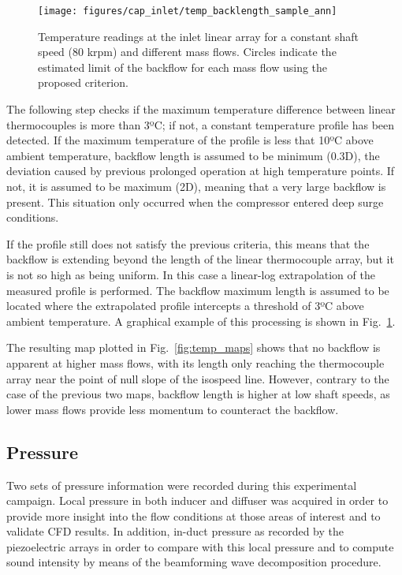 \begin{figure}[tb!]
\centering
\texttt{[image: figures/cap\_inlet/temp\_backlength\_sample\_ann]}
\caption[Backflow length temperature criterion]{Temperature readings at the inlet linear array for a constant shaft speed (80 krpm) and different mass flows. Circles indicate the estimated limit of the backflow for each mass flow using the proposed criterion.}
\label{fig:temp_backlength_sample}
\end{figure}

The following step checks if the maximum temperature difference between linear thermocouples is more than 3ºC; if not,  a constant temperature profile has been detected. If the maximum temperature of the profile is less that 10ºC above ambient temperature, backflow length is assumed to be minimum (0.3D), the deviation caused by previous prolonged operation at high temperature points. If not, it is assumed to be maximum (2D), meaning that a very large backflow is present. This situation only occurred when the compressor entered deep surge conditions.

If the profile still does not satisfy the previous criteria, this means that the backflow is extending beyond the length of the linear thermocouple array, but it is not so high as being uniform. In this case a linear-log extrapolation of the measured profile is performed. The backflow maximum length is assumed to be located where the extrapolated profile intercepts a threshold of 3ºC above ambient temperature. A graphical example of this processing is shown in Fig.~\ref{fig:temp_backlength_sample}.

The resulting map plotted in Fig.~\ref{fig:temp_maps} shows that no backflow is apparent at higher mass flows, with its length only reaching the thermocouple array near the point of null slope of the isospeed line. However, contrary to the case of the previous two maps, backflow length is higher at low shaft speeds, as lower mass flows provide less momentum to counteract the backflow.

\subsection{Pressure}
\label{sub:pressure}

Two sets of pressure information were recorded during this experimental campaign. Local pressure in both inducer and diffuser was acquired in order to provide more insight into the flow conditions at those areas of interest and to validate CFD results. In addition, in-duct pressure as recorded by the piezoelectric arrays in order to compare with this local pressure and to compute sound intensity by means of the beamforming wave decomposition procedure.


